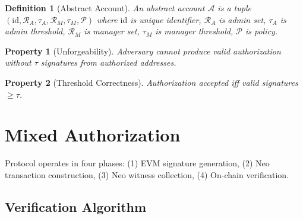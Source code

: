 \documentclass[10pt,twocolumn]{article}
\newtheorem{definition}{Definition}
\newtheorem{property}{Property}
\begin{document}
\begin{definition}[Abstract Account]
An abstract account $\mathcal{A}$ is a tuple $(\text{id}, \mathcal{R}_A, \tau_A, \mathcal{R}_M, \tau_M, \mathcal{P})$ where $\text{id}$ is unique identifier, $\mathcal{R}_A$ is admin set, $\tau_A$ is admin threshold, $\mathcal{R}_M$ is manager set, $\tau_M$ is manager threshold, $\mathcal{P}$ is policy.
\end{definition}

\begin{property}[Unforgeability]
Adversary cannot produce valid authorization without $\tau$ signatures from authorized addresses.
\end{property}

\begin{property}[Threshold Correctness]
Authorization accepted iff valid signatures $\geq \tau$.
\end{property}

\section{Mixed Authorization}

Protocol operates in four phases: (1) EVM signature generation, (2) Neo transaction construction, (3) Neo witness collection, (4) On-chain verification.

\subsection{Verification Algorithm}
\end{document}

